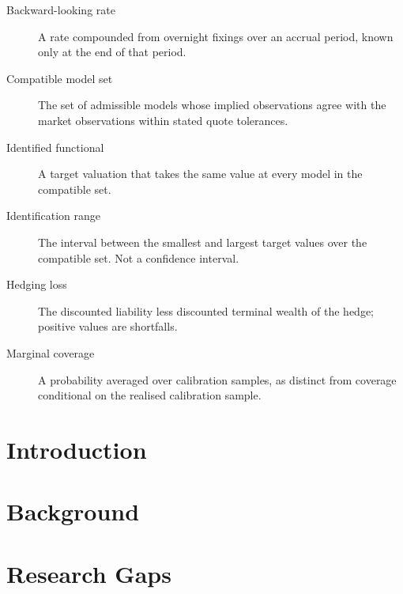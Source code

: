 \documentclass[12pt,final]{article}
\begin{document}
	\begin{description}
		\item[Backward-looking rate] A rate compounded from overnight fixings over an accrual period, known only at the end of that period.
		\item[Compatible model set] The set of admissible models whose implied observations agree with the market observations within stated quote tolerances.
		\item[Identified functional] A target valuation that takes the same value at every model in the compatible set.
		\item[Identification range] The interval between the smallest and largest target values over the compatible set. Not a confidence interval.
		\item[Hedging loss] The discounted liability less discounted terminal wealth of the hedge; positive values are shortfalls.
		\item[Marginal coverage] A probability averaged over calibration samples, as distinct from coverage conditional on the realised calibration sample.
	\end{description}

	\newpage

	\section{Introduction} %

	\section{Background} %

	\section{Research Gaps} %
\end{document}
